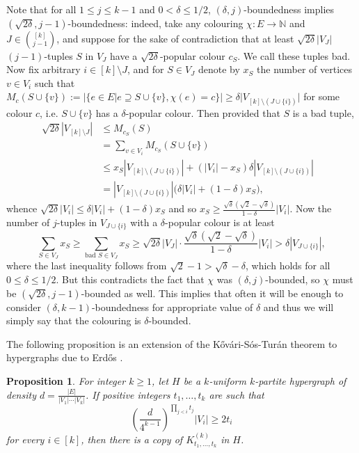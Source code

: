 \documentclass[10pt,a4paper]{article}
\theoremstyle{plain}
\newtheorem{proposition}[theorem]{Proposition}
\theoremstyle{definition}
\newcommand{\N}{\mathbb{N}}
\newcommand{\cmpltt}[3]{K^{(#1)}_{#2,\dots,#3}}
\begin{document}
Note that for all $1\le j\le k-1$ and $0<\delta\le 1/2$, $(\delta,j)$-boundedness implies $(\sqrt{2\delta},j-1)$-boundedness: indeed, take any colouring $\chi:E\to \N$ and $J\in\binom{[k]}{j-1}$, and suppose for the sake of contradiction that at least $\sqrt{2\delta}|V_J|$ $(j-1)$-tuples $S$ in $V_J$ have a $\sqrt{2\delta}$-popular colour $c_S$. We call these tuples bad. Now fix arbitrary $i\in[k]\setminus J$, and for $S\in V_J$ denote by $x_S$ the number of vertices $v\in V_i$ such that $M_c(S\cup\{v\}):=|\{e\in E|e\supseteq S\cup\{v\},\chi(e)=c\}|\ge \delta|V_{[k]\setminus(J\cup\{i\})}|$ for some colour $c$, i.e. $S\cup\{v\}$ has a $\delta$-popular colour. Then provided that $S$ is a bad tuple,
\begin{align*}
    \sqrt{2\delta}|V_{[k]\setminus J}|&\le M_{c_S}(S)&\\&=\sum_{v\in V_i} M_{c_S}(S\cup\{v\})\\&\le x_S|V_{[k]\setminus(J\cup\{i\})}|+(|V_i|-x_S)\delta|V_{[k]\setminus(J\cup\{i\})}|\\&=|V_{[k]\setminus(J\cup\{i\})}|\big(\delta|V_i|+(1-\delta)x_S\big),
\end{align*}
whence $\sqrt{2\delta}|V_i|\le \delta|V_i|+(1-\delta)x_S$ and so $x_S\ge \frac{\sqrt{\delta}\left(\sqrt2-\sqrt{\delta}\right)}{1-\delta}|V_i|$. Now the number of $j$-tuples in $V_{J\cup\{i\}}$ with a $\delta$-popular colour is at least
$$\sum_{S\in V_J}x_S\ge\sum_{\textrm{bad }S\in V_J}x_S\ge \sqrt{2\delta}|V_J|\cdot\frac{\sqrt{\delta}\left(\sqrt{2}-\sqrt{\delta}\right)}{1-\delta}|V_i|>\delta|V_{J\cup\{i\}}|,$$
where the last inequality follows from $\sqrt{2}-1>\sqrt{\delta}-\delta$, which holds for all $0\le\delta\le1/2$. But this contradicts the fact that $\chi$ was $(\delta,j)$-bounded, so $\chi$ must be $(\sqrt{2\delta},j-1)$-bounded as well. This implies that often it will be enough to consider $(\delta,k-1)$-boundedness for appropriate value of $\delta$ and thus we will simply say that the colouring is $\delta$-bounded.

The following proposition is an extension of the K\H{o}v\'ari-S\'os-Tur\'an theorem \cite{kHovari1954problem} to hypergraphs due to Erd\H{o}s \cite{erdos1964extremal}.

\begin{proposition}\label{prop-kst}
    For integer $k\ge1$, let $H$ be a $k$-uniform $k$-partite hypergraph of density $d=\frac{|E|}{|V_1|\cdots|V_k|}$. If positive integers $t_1,\dots,t_k$ are such that
    $$\left(\frac{d}{4^{k-1}}\right)^{\prod_{j<i}t_j}|V_i|\ge2t_i$$
    for every $i\in[k]$, then there is a copy of $\cmpltt{k}{t_1}{t_k}$ in $H$.
\end{proposition}
\end{document}
